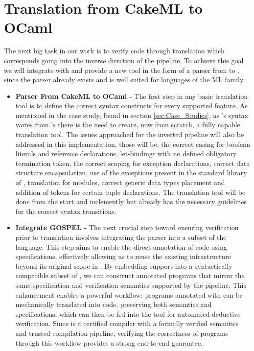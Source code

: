 \section{Translation from CakeML to OCaml}

The next big task in our work is to verify \cml code through translation which corresponds going into the inverse direction
of the pipeline. To achieve this goal we will integrate \gospel with \cml and provide a new tool in the form of a parser from
\cml to \ocaml, since the \gospel parser already exists and is well suited for languages of the ML family.

\begin{itemize}

\item \textbf{Parser From CakeML to OCaml -} The first step in any basic translation tool is to define the correct syntax constructs 
for every supported feature. As mentioned in the case study, found in section \ref{sec:Case_Studies}, as \cml's syntax varies from
\ocaml's there is the need to create, now from scratch, a fully capable translation tool. The issues approached for the inverted
pipeline will also be addressed in this implementation, those will be, the correct casing for boolean literals and reference
declarations, let-bindings with no defined obligatory termination token, the correct scoping for exception declarations, correct data
structure encapsulation, use of the exceptions present in the standard library of \ocaml, translation for modules, correct generic data 
types placement and addition of tokens for certain tuple declarations. The translation tool will be done from the start and inclemently
but already has the necessary guidelines for the correct syntax transitions.


\item \textbf{Integrate GOSPEL -} The next crucial step toward ensuring verification prior to translation involves integrating the 
\gospel parser into a subset of the \cml language. This step aims to enable the direct annotation of \cml code using \gospel specifications, 
effectively allowing us to reuse the existing \gospel infrastructure beyond its original scope in \ocaml. By embedding \gospel support into 
a syntactically compatible subset of \cml, we can construct annotated \cml programs that mirror the same specification and verification 
semantics supported by the \cameleer pipeline. This enhancement enables a powerful workflow: \cml programs annotated with \gospel can be 
mechanically translated into \ocaml code, preserving both semantics and specifications, which can then be fed into the \cameleer tool for 
automated deductive verification. Since \cml is a certified compiler with a formally verified semantics and trusted compilation pipeline, 
verifying the correctness of \cml programs through this workflow provides a strong end-to-end guarantee.


\end{itemize}
